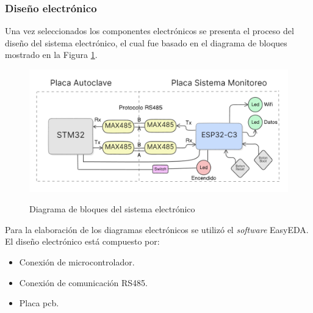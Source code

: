 \subsubsection{Diseño electrónico}
Una vez seleccionados los componentes electrónicos se presenta el proceso del diseño del sistema electrónico, el cual fue basado en el diagrama de bloques mostrado en la Figura \ref{fig:siselec}.
\begin{figure}[!htb]
    \centering
    \caption{Diagrama de bloques del sistema electrónico} %
    {\includegraphics[width=0.9\columnwidth]{Figuras/siselec.png}}\\
    \label{fig:siselec}
\end{figure}
\newpage
Para la elaboración de los diagramas electrónicos se utilizó el \textit{software} EasyEDA. El diseño electrónico está compuesto por:
\begin{itemize}
    \item Conexión de microcontrolador.
    \item Conexión de comunicación RS485.
    \item Placa \acrshort{pcb}.
\end{itemize}

